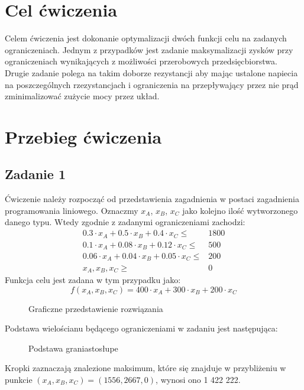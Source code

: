\documentclass[a4paper, 12pt]{article}
\begin{document}
	\noindent
	\section{Cel ćwiczenia}
        Celem ćwiczenia jest dokonanie optymalizacji dwóch funkcji celu na zadanych ograniczeniach.
        Jednym z przypadków jest zadanie maksymalizacji zysków przy ograniczeniach wynikających z
        możliwości przerobowych przedsięcbiorstwa. Drugie zadanie polega na takim doborze rezystancji 
        aby mając ustalone napiecia na poszczególnych rzezystancjach i ograniczenia na przepływający 
        przez nie prąd zminimalizować zużycie mocy przez układ.
	\section{Przebieg ćwiczenia}
		\subsection{Zadanie 1}
            Ćwiczenie należy rozpocząć od przedstawienia zagadnienia w postaci zagadnienia 
            programowania liniowego. Oznaczmy $x_A$, $x_B$, $x_C$ jako kolejno ilość wytworzonego 
            danego typu. Wtedy zgodnie z zadanymi ograniczeniami zachodzi:
            $$
                \begin{aligned}
                    0.3 \cdot x_A + 0.5 \cdot x_B + 0.4 \cdot x_C \leq & 1800 \\
                    0.1 \cdot x_A + 0.08 \cdot x_B + 0.12 \cdot x_C \leq & 500 \\
                    0.06 \cdot x_A + 0.04 \cdot x_B + 0.05 \cdot x_C \leq & 200 \\
                    x_A, x_B, x_C \geq & 0
                \end{aligned}
            $$
            Funkcja celu jest zadana w tym przypadku jako:
            $$
                f(x_A, x_B, x_C) = 400 \cdot x_A + 300 \cdot x_B + 200 \cdot x_C
            $$
            \begin{figure}[H]
                \centering
                \def \svgwidth{0.7\columnwidth}
                
                \caption{Graficzne przedstawienie rozwiązania}
            \end{figure}\noindent
            Podstawa  wielościanu będącego ograniczeniami w zadaniu jest następująca:
            \begin{figure}[H]
                \centering
                \def \svgwidth{0.7\columnwidth}
                
                \caption{Podstawa graniastosłupe}
            \end{figure}\noindent
            Kropki zaznaczają znalezione maksimum, które się znajduje w przybliżeniu w punkcie
            $(x_A, x_B, x_C) = (1556, 2667, 0)$, wynosi ono 1 422 222.
\end{document}
